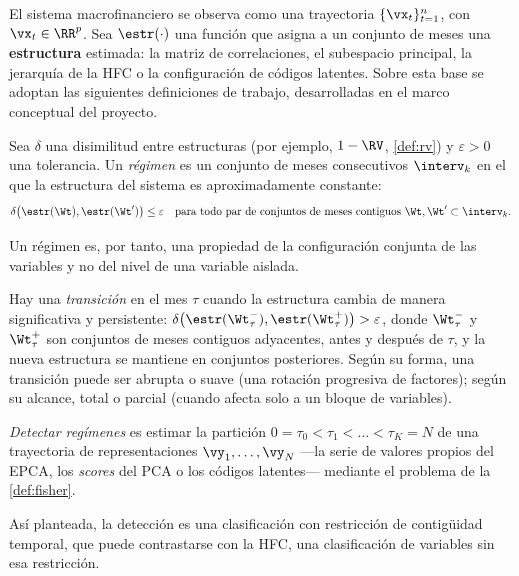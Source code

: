 El sistema macrofinanciero se observa como una trayectoria $\{\vx_t\}_{t=1}^{n}$, con
$\vx_t\in\RR^{p}$. Sea $\estr(\cdot)$ una función que asigna a un conjunto de meses una
\textbf{estructura} estimada: la matriz de correlaciones, el subespacio principal, la jerarquía de
la HFC o la configuración de códigos latentes. Sobre esta base se adoptan las siguientes
definiciones de trabajo, desarrolladas en el marco conceptual del proyecto.

\begin{definicion}[Régimen]\label{def:regimen}
Sea $\delta$ una disimilitud entre estructuras (por ejemplo, $1-\RV$, \cref{def:rv}) y
$\varepsilon>0$ una tolerancia. Un \emph{régimen} es un conjunto de meses consecutivos
$\interv_k$ en el que la estructura del sistema es aproximadamente constante:
\begin{equation}\label{eq:regimen}
  \delta\bigl(\estr(\Wt),\estr(\Wt')\bigr)\le\varepsilon
  \quad\text{para todo par de conjuntos de meses contiguos } \Wt,\Wt'\subset\interv_k .
\end{equation}
\end{definicion}

Un régimen es, por tanto, una propiedad de la configuración conjunta de las variables y no del
nivel de una variable aislada.

\begin{definicion}[Transición]\label{def:transicion}
Hay una \emph{transición} en el mes $\tau$ cuando la estructura cambia de manera significativa y
persistente: $\delta\bigl(\estr(\Wt_\tau^{-}),\estr(\Wt_\tau^{+})\bigr)>\varepsilon$, donde
$\Wt_\tau^{-}$ y $\Wt_\tau^{+}$ son conjuntos de meses contiguos adyacentes, antes y después de
$\tau$, y la nueva estructura se mantiene en conjuntos posteriores. Según su forma, una
transición puede ser abrupta o suave (una rotación progresiva de factores); según su alcance,
total o parcial (cuando afecta solo a un bloque de variables).
\end{definicion}

\begin{definicion}[Detección]\label{def:deteccion}
\emph{Detectar regímenes} es estimar la partición $0=\tau_0<\tau_1<\dots<\tau_K=N$ de una
trayectoria de representaciones $\vy_1,\dots,\vy_N$ ---la serie de valores propios del EPCA, los
\emph{scores} del PCA o los códigos latentes--- mediante el problema de la \cref{def:fisher}.
\end{definicion}

Así planteada, la detección es una clasificación con restricción de contigüidad temporal, que
puede contrastarse con la HFC, una clasificación de variables sin esa restricción.

